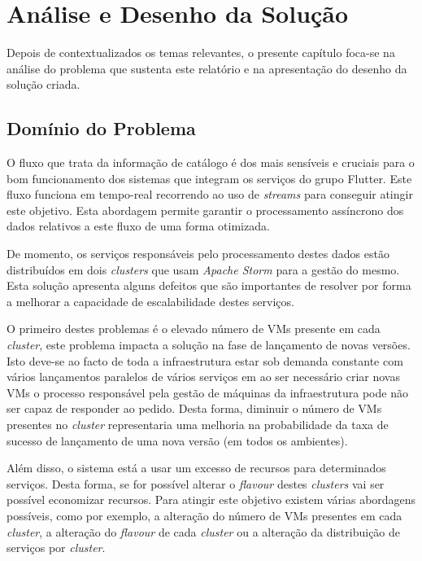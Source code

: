 \chapter{Análise e Desenho da Solução}
\label{sec:3-Analise}

Depois de contextualizados os temas relevantes, o presente capítulo foca-se na análise do problema 
que sustenta este relatório e na apresentação do desenho da solução criada.

\section{Domínio do Problema}

O fluxo que trata da informação de catálogo é dos mais sensíveis e cruciais para o bom funcionamento
dos sistemas que integram os serviços do grupo Flutter. Este fluxo funciona em tempo-real recorrendo
ao uso de \textit{streams} para conseguir atingir este objetivo. Esta abordagem permite garantir
o processamento assíncrono dos dados relativos a este fluxo de uma forma otimizada.

De momento, os serviços responsáveis pelo processamento destes dados estão distribuídos em dois
\textit{\glspl{cluster}} que usam \textit{Apache Storm} para a gestão do mesmo. Esta solução apresenta alguns
defeitos que são importantes de resolver por forma a melhorar a capacidade de escalabilidade destes
serviços. 

O primeiro destes problemas é o elevado número de \acp{VM} presente em cada \textit{\gls{cluster}},
este problema impacta a solução na fase de lançamento de novas versões. Isto deve-se ao facto de
toda a infraestrutura estar sob demanda constante com vários lançamentos paralelos de vários serviços
em ao ser necessário criar novas \acp{VM} o processo responsável pela gestão de máquinas da
infraestrutura pode não ser capaz de responder ao pedido. Desta forma, diminuir o número de \acp{VM}
presentes no \textit{\gls{cluster}} representaria uma melhoria na probabilidade da taxa de sucesso de
lançamento de uma nova versão (em todos os ambientes).

Além disso, o sistema está a usar um excesso de recursos para determinados serviços. Desta forma,
se for possível alterar o \textit{\gls{flavour}} destes \textit{\glspl{cluster}} vai ser possível economizar
recursos. Para atingir este objetivo existem várias abordagens possíveis, como por exemplo, a
alteração do número de \acp{VM} presentes em cada \textit{\gls{cluster}}, a alteração do \textit{\gls{flavour}}
de cada \textit{\gls{cluster}} ou a alteração da distribuição de serviços por \textit{\gls{cluster}}.


